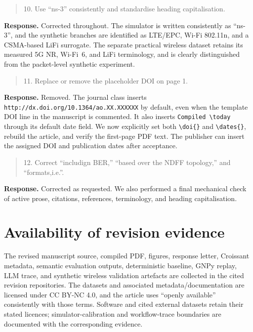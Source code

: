 \documentclass[11pt]{article}
\newenvironment{reviewercomment}{\begin{quote}\color{reviewblue}}{\end{quote}}
\newenvironment{authorresponse}{\color{responsegreen}\textbf{Response.} }{\par\color{black}}
\begin{document}
\begin{reviewercomment}
10. Use ``ns-3'' consistently and standardise heading capitalisation.
\end{reviewercomment}
\begin{authorresponse}
Corrected throughout. The simulator is written consistently as ``ns-3'', and the synthetic branches are identified as LTE/EPC, Wi-Fi 802.11n, and a CSMA-based LiFi surrogate. The separate practical wireless dataset retains its measured 5G NR, Wi-Fi~6, and LiFi terminology, and is clearly distinguished from the packet-level synthetic experiment.
\end{authorresponse}

\begin{reviewercomment}
11. Replace or remove the placeholder DOI on page 1.
\end{reviewercomment}
\begin{authorresponse}
Removed. The journal class inserts \texttt{http://dx.doi.org/10.1364/ao.XX.XXXXXX} by default, even when the template DOI line in the manuscript is commented. It also inserts \verb|Compiled \today| through its default date field. We now explicitly set both \verb|\doi{}| and \verb|\dates{}|, rebuild the article, and verify the first-page PDF text. The publisher can insert the assigned DOI and publication dates after acceptance.
\end{authorresponse}

\begin{reviewercomment}
12. Correct ``includign BER,'' ``based over the NDFF topology,'' and ``formats,i.e.''.
\end{reviewercomment}
\begin{authorresponse}
Corrected as requested. We also performed a final mechanical check of active prose, citations, references, terminology, and heading capitalisation.
\end{authorresponse}

\section*{Availability of revision evidence}

The revised manuscript source, compiled PDF, figures, response letter, Croissant metadata, semantic evaluation outputs, deterministic baseline, GNPy replay, LLM trace, and synthetic wireless validation artefacts are collected in the cited revision repositories. The datasets and associated metadata/documentation are licensed under CC BY-NC 4.0, and the article uses ``openly available'' consistently with those terms. Software and cited external datasets retain their stated licences; simulator-calibration and workflow-trace boundaries are documented with the corresponding evidence.
\end{document}
